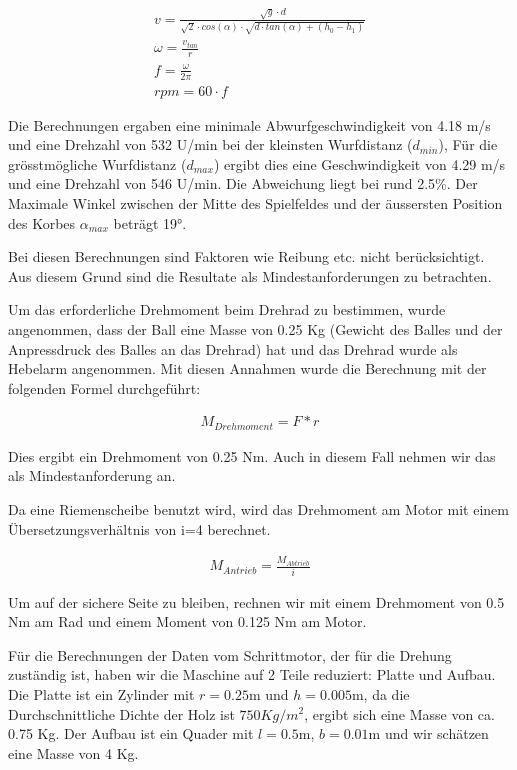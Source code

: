 \begin{gather}
	v=\frac{\sqrt{g} \cdot d}{\sqrt{2} \cdot cos(\alpha) \cdot \sqrt{d \cdot tan(\alpha)+(h_0-h_1)}}\\
	\omega=\frac{v_{tan}}{r}\\
	f=\frac{\omega}{2\pi}\\
	rpm=60 \cdot f
\end{gather}

Die Berechnungen ergaben eine minimale Abwurfgeschwindigkeit von 4.18 m/s und eine Drehzahl von 532 U/min bei der kleinsten Wurfdistanz ($d_{min}$), 
Für die grösstmögliche Wurfdistanz ($d_{max}$) ergibt dies eine Geschwindigkeit von 4.29 m/s und eine Drehzahl von 546 U/min. 
Die Abweichung liegt bei rund 2.5\%.
Der Maximale Winkel zwischen der Mitte des Spielfeldes und der äussersten Position des Korbes $\alpha_{max}$ beträgt 19°.

Bei diesen Berechnungen sind Faktoren wie Reibung etc. nicht berücksichtigt. Aus diesem Grund sind die Resultate als Mindestanforderungen zu betrachten.

Um das erforderliche Drehmoment beim Drehrad zu bestimmen, wurde angenommen, dass der Ball eine Masse von 0.25 Kg (Gewicht des Balles und der Anpressdruck des Balles an das Drehrad) hat und das Drehrad wurde als Hebelarm angenommen. Mit diesen Annahmen wurde die Berechnung mit der folgenden Formel durchgeführt:

\begin{gather}
	M_{Drehmoment}=F*r
\end{gather}

Dies ergibt ein Drehmoment von 0.25 Nm. Auch in diesem Fall nehmen wir das als Mindestanforderung an.

Da eine Riemenscheibe benutzt wird, wird das Drehmoment am Motor mit einem Übersetzungsverhältnis von i=4 berechnet.

\begin{gather}
	M_{Antrieb}=\frac{M_{Abtrieb}}{i}
\end{gather}

Um auf der sichere Seite zu bleiben, rechnen wir mit einem Drehmoment von 0.5 Nm am Rad und einem Moment von 0.125 Nm am Motor.

Für die Berechnungen der Daten vom Schrittmotor, der für die Drehung zuständig ist, haben wir die Maschine auf 2 Teile reduziert: Platte und Aufbau.
Die Platte ist ein Zylinder mit $r=0.25$m und $h=0.005$m, da die Durchschnittliche Dichte der Holz ist $750 Kg/m^2$, ergibt sich eine Masse von ca. 0.75 Kg.
Der Aufbau ist ein Quader mit $l=0.5$m, $b=0.01$m und wir schätzen eine Masse von 4 Kg.

